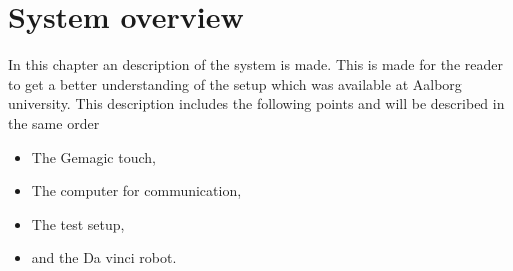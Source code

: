 \chapter{System overview}\label{cha:overview}

In this chapter an description of the system is made. This is made for the reader to get a better understanding of the setup which was available at Aalborg university. This description includes the following points and will be described in the same order

\begin{itemize}
  \item The Gemagic touch,
  \item The computer for communication,
  \item The test setup,
  \item and the Da vinci robot.
\end{itemize}



%

%





%

